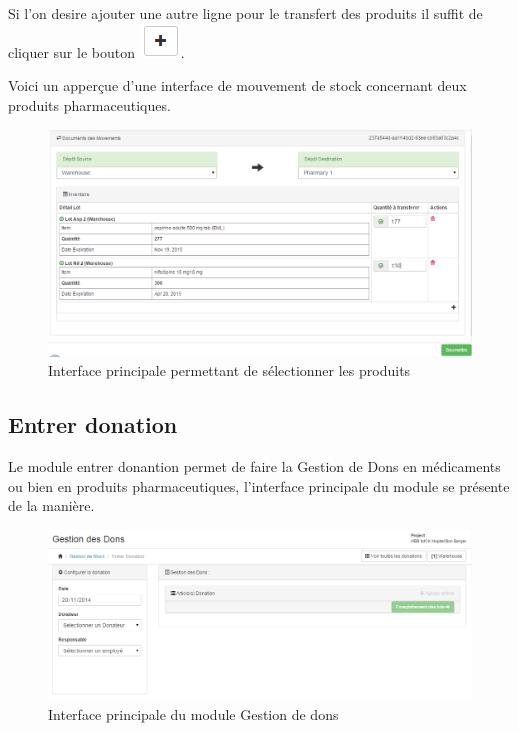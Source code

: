 \documentclass[12pt,a4paper]{report}
\begin{document}
Si l'on desire ajouter une autre ligne pour le transfert des produits il suffit de cliquer sur le bouton \includegraphics[scale=0.7]{pic/plusBlack.png}. 

Voici un apperçue d'une interface de mouvement de stock concernant deux produits pharmaceutiques.

\begin{figure}[h]
\begin{center}
\includegraphics[width=14cm]{pic/DocMovTransfert.png}
\end{center}
\caption{Interface principale permettant de sélectionner les produits}
\label{Interface principale permettant de sélectionner les produits}
\end{figure}

\newpage
\subsection{Entrer donation}
Le module entrer donantion permet de faire la Gestion de Dons en médicaments ou bien en produits pharmaceutiques, l'interface principale du module se présente de la manière.

\begin{figure}[h]
\begin{center}
\includegraphics[width=14cm]{pic/GestionDon.png}
\end{center}
\caption{Interface principale du module Gestion de dons}
\label{Interface principale du module Gestion de dons}
\end{figure}
\end{document}
